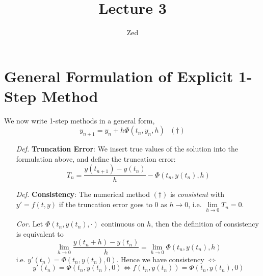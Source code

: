 \documentclass[a4paper, 11pt]{article}
\title{\textbf{Lecture 3}}
\author{Zed}{}
\begin{document}
\maketitle

\section{General Formulation of Explicit 1-Step Method}
We now write 1-step methods in a general form,
$$
y_{n+1} = y_n + h\Phi(t_n, y_n, h)~~~(\dag)
$$
\begin{itemize}
	\item[\textit{Def.}] \textbf{Truncation Error}: We insert true values of the solution into the formulation above, and define the truncation error:
	$$
	T_n = \frac{y(t_{n+1})-y(t_n)}{h} - \Phi(t_n, y(t_n), h)
	$$
	\item[\textit{Def.}] \textbf{Consistency}: The numerical method $(\dag)$ is \emph{consistent} with $y'=f(t,y)$ if the truncation error goes to $0$ as $h\to 0$, i.e. $\lim\limits_{h\rightarrow0}T_n = 0$. 

	\item[\textit{Cor.}] Let $\Phi(t_n, y(t_n), \cdot)$ continuous on $h$, then the definition of consistency is equivalent to
	$$
	\lim\limits_{h\rightarrow 0}\frac{y(t_{n}+h)-y(t_n)}{h} = \lim\limits_{h\rightarrow 0} \Phi(t_n, y(t_n), h)
	$$
	i.e. $y'(t_n) = \Phi(t_n, y(t_n), 0)$. Hence we have consistency $\iff$
	$$
	y'(t_n) = \Phi(t_n, y(t_n), 0) \iff f(t_n, y(t_n)) = \Phi(t_n, y(t_n), 0)
	$$
\end{itemize}
\end{document}
